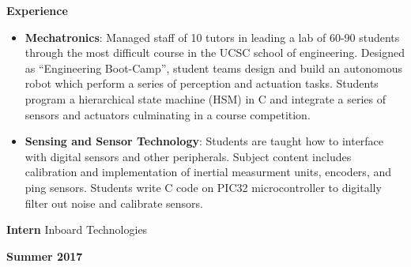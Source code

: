 \documentclass[paper=a4,fontsize=11pt]{article} %
\def \subSectionSpace   {0.25cm}     %
\def \leftColSpace      {0.1}       %
\def \middleColSpace    {0.71}       %
\def \bigMiddleColSpace {0.8}       %
\def \rightColSpace     {0.25}      %
\begin{document}
    \noindent
    \begin{minipage}[t]{\leftColSpace\linewidth}
        \noindent \textbf{Experience}
    \end{minipage}
    \begin{minipage}[t]{\bigMiddleColSpace\linewidth}
        \begin{itemize}[noitemsep,topsep=0pt]
            \item \textbf{Mechatronics}: Managed staff of 10 tutors in leading a lab of 60-90 students through the most difficult course in the UCSC school of engineering. Designed as “Engineering Boot-Camp”, student teams design and build an autonomous robot which perform a series of perception and actuation tasks. Students program a hierarchical state machine (HSM) in C and integrate a series of sensors and actuators culminating in a course competition.
            \vspace{\subSectionSpace}
            \item \textbf{Sensing and Sensor Technology}: Students are taught how to interface with digital sensors and other peripherals. Subject content includes calibration and implementation of inertial measurment units, encoders, and ping sensors. Students write C code on PIC32 microcontroller to digitally filter out noise and calibrate sensors.
        \end{itemize}
    \end{minipage}

    \vspace{\subSectionSpace}  
    \noindent
    \begin{minipage}[t]{\leftColSpace\linewidth}
        \hfill
    \end{minipage}
    \begin{minipage}[t]{\middleColSpace\linewidth}
        \noindent \textbf{Intern} \quad Inboard Technologies
    \end{minipage}
    \begin{minipage}[t]{\rightColSpace\linewidth}
        \begin{flushleft}
            \noindent \textbf{Summer 2017}
        \end{flushleft}
    \end{minipage}
\end{document}

